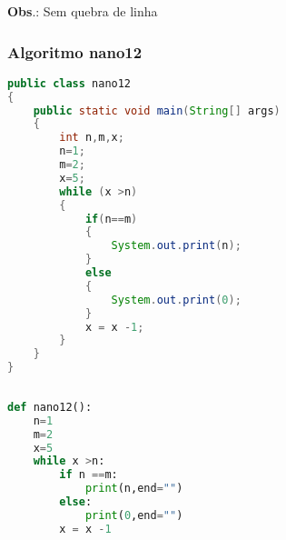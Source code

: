 \documentclass[hidelinks,12pt]{article}
\begin{document}
	\textbf{Obs}.: Sem quebra de linha\\
	
	\subsubsection{Algoritmo nano12}
	
	\begin{lstlisting}[caption=Código em Java,language=java]
public class nano12
{
	public static void main(String[] args)
	{
		int n,m,x;
		n=1;
		m=2;
		x=5;
		while (x >n)
		{
			if(n==m)
			{
				System.out.print(n);
			}
			else
			{
				System.out.print(0);
			}
			x = x -1;
		}
	}
}	
	
	\end{lstlisting}
	
	\begin{lstlisting}[caption=Código em python,language=Python]
def nano12():
	n=1 
	m=2
	x=5
	while x >n:
		if n ==m:
			print(n,end="")
		else:
			print(0,end="")
		x = x -1	
	
	\end{lstlisting}
	
\end{document}
